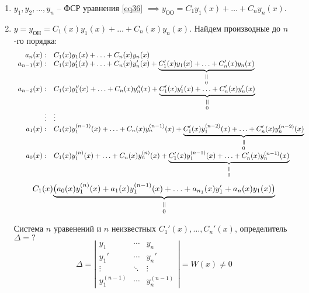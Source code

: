 \begin{note}\leavevmode
    \begin{enumerate}
        \item $y_1,y_2,\ldots,y_n$ -- ФСР уравнения \ref{eq36} $\implies y_{\text{ОО}} = C_1y_1(x) + \ldots + C_ny_n(x)$.
        \item $y = y_{\text{ОН}} = C_1(x)y_1(x) + \ldots + C_n(x)y_n(x)$. Найдем производные до $n$-го порядка:
              \[
                  \begin{array}{rl}
                      a_{n}(x):   & C_1(x)y_1(x) + \ldots + C_n(x)y_n(x)                                                                                                    \\
                      a_{n-1}(x): & C_1(x)y'_1(x) + \ldots + C_n(x)y'_n(x) + \equalto{\underbrace{C_1'(x)y_1(x) + \ldots + C_n'(x)y_n(x)}}{0}                               \\
                      a_{n-2}(x): & C_1(x)y''_1(x) + \ldots + C_n(x)y''_n(x) + \equalto{\underbrace{C_1'(x)y_1'(x) + \ldots + C_n'(x)y_n'(x)}}{0}                           \\
                      \vdots      & \vdots                                                                                                                                  \\
                      a_1(x):     & C_1(x)y^{(n-1)}_1(x) + \ldots + C_n(x)y^{(n-1)}_n(x) + \equalto{\underbrace{C_1'(x)y_1^{(n-2)}(x) + \ldots + C_n'(x)y_n^{(n-2)}(x)}}{0} \\
                      a_0(x):     & C_1(x)y^{(n)}_1(x) + \ldots + C_n(x)y^{(n)}_n(x) + \equalto{\underbrace{C_1'(x)y_1^{(n-1)}(x) + \ldots + C_n'(x)y_n^{(n-1)}(x)}}{0}     \\
                  \end{array}
              \]
              \[
                  C_1(x)\equalto{\underbrace{\big(a_0(x)y_1^{(n)}(x) + a_1(x)y_1^{(n-1)}(x) + \ldots + a_{n_1}(x)y_1' + a_n(x)y_1(x)\big)}}{0}
              \]

              Система $n$ уравенений и $n$ неизвестных $C_1'(x), \ldots, C_n'(x)$, определитель $\Delta = ?$
              \[
                  \Delta = \left|\begin{matrix}
                      y_1         & \cdots & y_n         \\
                      y_1'        & \cdots & y_n'        \\
                      \vdots      & \ddots & \vdots      \\
                      y_1^{(n-1)} & \cdots & y_n^{(n-1)}
                  \end{matrix}\right| = W(x) \ne 0
              \]
    \end{enumerate}
\end{note}

